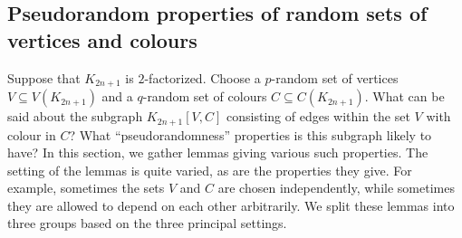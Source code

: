 









\subsection{Pseudorandom properties of random sets of vertices and colours}\label{Section_pseudorandomness}
Suppose that $K_{2n+1}$ is $2$-factorized. Choose a $p$-random set of vertices $V\subseteq V(K_{2n+1})$  and a $q$-random set of colours $C\subseteq C(K_{2n+1})$. What can be said about the subgraph $K_{2n+1}[V,C]$ consisting of edges within the set $V$ with colour in $C$? What ``pseudorandomness'' properties is this subgraph likely to have? In this section, we gather lemmas giving various such properties.
The setting of the lemmas is quite varied, as are the properties they give. For example, sometimes the sets $V$ and $C$ are chosen independently, while sometimes they are allowed to depend on each other arbitrarily. We split these lemmas into three groups based on the three principal settings.



